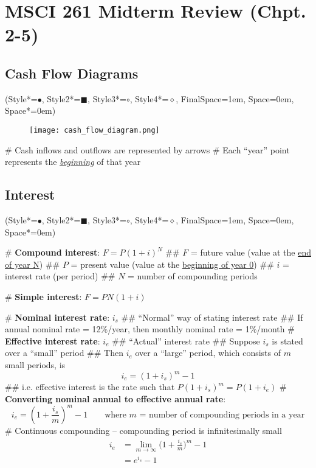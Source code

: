 \documentclass[11pt, oneside]{article}
\newcommand*{\begineasylist}{\begin{easylist}[itemize]\ListProperties(Style*=$\bullet$\quad, Style2*=\tiny$\blacksquare$\quad, Style3*=$\circ$\quad, Style4*=$\diamond$\quad, FinalSpace=1em, Space=0em, Space*=0em)}
\begin{document}
\section*{MSCI 261 Midterm Review (Chpt. 2-5)}

\subsection*{Cash Flow Diagrams}
\begineasylist

\begin{figure}[!ht]
    \centering
    \texttt{[image: cash\_flow\_diagram.png]}
\end{figure}

# Cash inflows and outflows are represented by arrows
# Each ``year'' point represents the \emph{\underline{beginning}} of that year

\end{easylist}
\subsection*{Interest}
\begineasylist

# \textbf{Compound interest}: $F = P(1 + i)^N$
## $F$ = future value (value at the \underline{end of year N})
## $P$ = present value (value at the \underline{beginning of year 0})
## $i$ = interest rate (per period)
## $N$ = number of compounding periods

# \textbf{Simple interest}: $F = PN(1 + i)$

# \textbf{Nominal interest rate}: $i_s$
## ``Normal'' way of stating interest rate
## If annual nominal rate = 12\%/year, then monthly nominal rate = 1\%/month
# \textbf{Effective interest rate}: $i_e$
## ``Actual'' interest rate
## Suppose $i_s$ is stated over a ``small'' period
## Then $i_e$ over a ``large'' period, which consists of $m$ small periods, is
\[ i_e = (1 + i_s)^m - 1 \]
## i.e. effective interest is the rate such that $P(1 + i_s)^m = P(1+i_e)$
# \textbf{Converting nominal annual to effective annual rate}:
\[ i_e = (1 + \frac{i_s}{m})^m - 1 \qquad \text{where $m$ = number of compounding periods in a year} \]
# Continuous compounding -- compounding period is infinitesimally small
\begin{align*}
i_e &= \lim_{m \rightarrow \infty} \Big(1 + \frac{i_s}{m}\Big)^m - 1\\
&= e^{i_s} -1
\end{align*}

\end{easylist}
\end{document}
